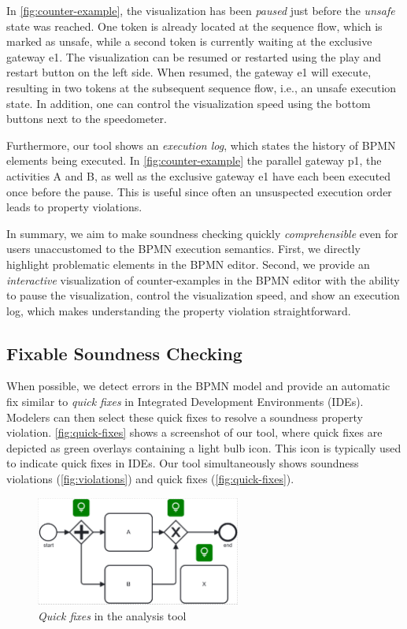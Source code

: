 \documentclass[runningheads]{llncs}
\begin{document}
In \autoref{fig:counter-example}, the visualization has been \textit{paused} just before the \textit{unsafe} state was reached.
One token is already located at the sequence flow, which is marked as unsafe, while a second token is currently waiting at the exclusive gateway \textsf{e1}.
The visualization can be resumed or restarted using the play and restart button on the left side.
When resumed, the gateway \textsf{e1} will execute, resulting in two tokens at the subsequent sequence flow, i.e., an unsafe execution state.
In addition, one can control the visualization speed using the bottom buttons next to the speedometer.

Furthermore, our tool shows an \textit{execution log}, which states the history of BPMN elements being executed.
In \autoref{fig:counter-example} the parallel gateway \textsf{p1}, the activities \textsf{A} and \textsf{B}, as well as the exclusive gateway \textsf{e1} have each been executed once before the pause.
This is useful since often an unsuspected execution order leads to property violations.

In summary, we aim to make soundness checking quickly \textit{comprehensible} even for users unaccustomed to the BPMN execution semantics.
First, we directly highlight problematic elements in the BPMN editor.
Second, we provide an \textit{interactive} visualization of counter-examples in the BPMN editor with the ability to pause the visualization, control the visualization speed, and show an execution log, which makes understanding the property violation straightforward.

\subsection{Fixable Soundness Checking}

When possible, we detect errors in the BPMN model and provide an automatic fix similar to \textit{quick fixes} in Integrated Development Environments (IDEs).
Modelers can then select these quick fixes to resolve a soundness property violation.
\autoref{fig:quick-fixes} shows a screenshot of our tool, where quick fixes are depicted as green overlays containing a light bulb icon.
This icon is typically used to indicate quick fixes in IDEs.
Our tool simultaneously shows soundness violations (\autoref{fig:violations}) and quick fixes (\autoref{fig:quick-fixes}).

\begin{figure}[ht]
	\centering
	\includegraphics[width=0.6\textwidth]{images/quickfixes}
	\caption{\textit{Quick fixes} in the analysis tool}
	\label{fig:quick-fixes}
\end{figure}
\end{document}
